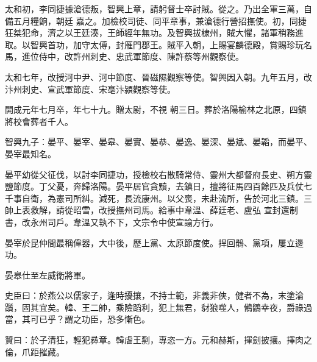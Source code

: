 \begin{pinyinscope}
 太和初，李同捷據滄德叛，智興上章，請躬督士卒討賊。從之。乃出全軍三萬，自備五月糧餉，朝廷
 嘉之。加檢校司徒、同平章事，兼滄德行營招撫使。初，同捷狂桀犯命，濟之以王廷湊，王師經年無功。及智興拔棣州，賊大懼，諸軍稍務進取。以智興首功，加守太傅，封雁門郡王。賊平入朝，上賜宴麟德殿，賞賜珍玩名馬，進位侍中，改許州刺史、忠武軍節度、陳許蔡等州觀察使。



 太和七年，改授河中尹、河中節度、晉磁隰觀察等使。智興因入朝。九年五月，改汴州刺史、宣武軍節度、宋亳汴潁觀察等使。



 開成元年七月卒，年七十九。贈太尉，不視
 朝三日。葬於洛陽榆林之北原，四鎮將校會葬者千人。



 智興九子：晏平、晏宰、晏皋、晏實、晏恭、晏逸、晏深、晏斌、晏韜，而晏平、晏宰最知名。



 晏平幼從父征伐，以討李同捷功，授檢校右散騎常侍、靈州大都督府長史、朔方靈鹽節度。丁父憂，奔歸洛陽。晏平居官貪黷，去鎮日，擅將征馬四百餘匹及兵仗七千事自衛，為憲司所糾。減死，長流康州。以父喪，未赴流所，告於河北三鎮。三帥上表救解，請從昭雪，改授撫州司馬。給事中韋溫、薛廷老、盧弘
 宣封還制書，改永州司戶。韋溫又執不下，文宗令中使宣諭方行。



 晏宰於昆仲間最稱偉器，大中後，歷上黨、太原節度使。捍回鶻、黨項，屢立邊功。



 晏皋仕至左威衛將軍。



 史臣曰：於燕公以儒家子，逢時擾攘，不持士範，非義非俠，健者不為，末塗淪躓，固其宜矣。韓、王二帥，乘險蹈利，犯上無君，豺狼噬人，鵂鶹幸夜，爵祿過當，其可已乎？謂之功臣，恐多慚色。



 贊曰：於子清狂，輕犯彞章。韓虐王剽，專恣一方。元和赫斯，揮劍披攘。擇肉之倫，爪距摧藏。



\end{pinyinscope}